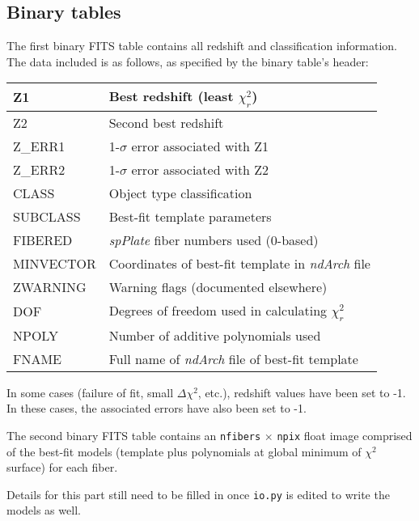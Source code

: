 \documentclass[12pt]{article}
\begin{document}
\subsection{Binary tables}

The first binary FITS table contains all redshift and classification information.
The data included is as follows, as specified by the binary table's header:

\begin{center}
	\begin{tabular}{ | l | l | }
	\hline
	Z1 & Best redshift (least $\chi_r^2$) \\ \hline
	Z2 & Second best redshift \\ \hline
	Z\_ERR1 & 1-$\sigma$ error associated with Z1 \\ \hline
	Z\_ERR2 & 1-$\sigma$ error associated with Z2 \\ \hline
	CLASS & Object type classification \\ \hline
	SUBCLASS & Best-fit template parameters \\ \hline
	FIBERED & \textit{spPlate} fiber numbers used (0-based) \\ \hline
	MINVECTOR & Coordinates of best-fit template in \textit{ndArch} file \\ \hline
	ZWARNING & Warning flags (documented elsewhere) \\ \hline
	DOF & Degrees of freedom used in calculating $\chi_r^2$ \\ \hline
	NPOLY & Number of additive polynomials used \\ \hline
	FNAME & Full name of \textit{ndArch} file of best-fit template \\
	\hline
	\end{tabular}
\end{center}

In some cases (failure of fit, small $\Delta\chi^2$, etc.), redshift values have
been set to -1.  In these cases, the associated errors have also been set to -1.

The second binary FITS table contains an \texttt{nfibers} $\times$ \texttt{npix} float
image comprised of the best-fit models (template plus polynomials at global
minimum of $\chi^2$ surface) for each fiber.  

Details for this part still need to be filled in once \texttt{io.py} is edited to write
the models as well.
\end{document}
